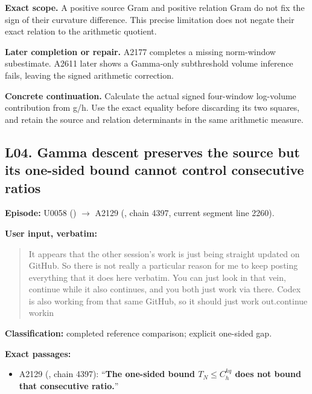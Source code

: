 \textbf{Exact scope.} A positive source Gram and positive relation Gram
do not fix the sign of their curvature difference. This precise
limitation does not negate their exact relation to the arithmetic
quotient.

\textbf{Later completion or repair.} A2177 completes a missing
norm-window subestimate. A2611 later shows a Gamma-only subthreshold
volume inference fails, leaving the signed arithmetic correction.

\textbf{Concrete continuation.} Calculate the actual signed four-window
log-volume contribution from g/h. Use the exact equality before
discarding its two squares, and retain the source and relation
determinants in the same arithmetic measure.

\subsection{L04. Gamma descent preserves the source but its one-sided
bound cannot control consecutive
ratios}\label{TranscriptLedgerStage:l04.-gamma-descent-preserves-the-source-but-its-one-sided-bound-cannot-control-consecutive-ratios}

\textbf{Episode:} U0058
(\protect{})
\allowbreak{}\ensuremath{→}\allowbreak{} A2129
(\protect{}, chain 4397,
current segment line 2260).

\textbf{User input, verbatim:}

\begin{quote}
It appears that the other session's work is just being straight updated
on GitHub. So there is not really a particular reason for me to keep
posting everything that it does here verbatim. You can just look in that
vein, continue while it also continues, and you both just work via
there. Codex is also working from that same GitHub, so it should just
work out.continue workin
\end{quote}

\textbf{Classification:} completed reference comparison; explicit
one-sided gap.

\textbf{Exact passages:}

\begin{itemize}
\tightlist
\item
  A2129 (\protect{}, chain
  4397): ``\textbf{The one-sided bound \(T_N\le C_h^{kq}\) does not
  bound that consecutive ratio.}''
\end{itemize}

